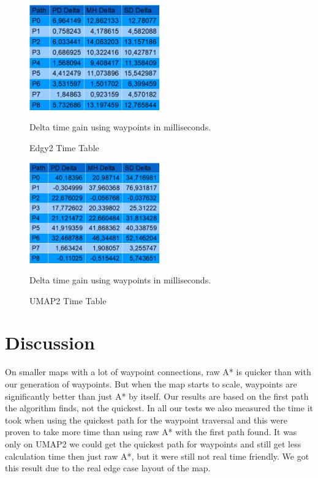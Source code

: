 \documentclass[a4paper]{article}
\begin{document}
\begin{figure}[h!]
\centering
\includegraphics[width=0.5\textwidth,height=\textheight,keepaspectratio]{ChartsAndFigures/Edgy2_timeTable.png}
\caption{Edgy2 Time Table}
Delta time gain using waypoints in milliseconds.
\label{fig:Edgy2_cd}
\end{figure}
\begin{figure}[h!]
\centering
\includegraphics[width=0.5\textwidth,height=\textheight,keepaspectratio]{ChartsAndFigures/UMAP2_timeTable.png}
\caption{UMAP2 Time Table}
Delta time gain using waypoints in milliseconds.
\label{fig:UMAP2_cd}
\end{figure}

\section{Discussion}
On smaller maps with a lot of waypoint connections, raw A* is quicker than with our generation of waypoints. But when the map starts to scale, waypoints are significantly better than just A* by itself.
Our results are based on the first path the algorithm finds, not the quickest. In all our tests we also measured the time it took when using the quickest path for the waypoint traversal and this were proven to take more time than using raw A* with the first path found. It was only on UMAP2 we could get the quickest path for waypoints and still get less calculation time then just raw A*, but it were still not real time friendly. We got this result due to the real edge case layout of the map.
	
\end{document}
